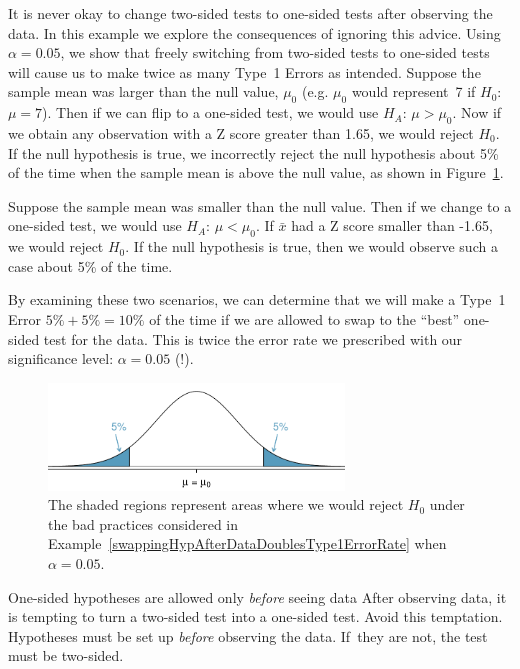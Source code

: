 \begin{example}{It is never okay to change two-sided tests to one-sided tests after observing the data. In this example we explore the consequences of ignoring this advice. Using $\alpha=0.05$, we show that freely switching from two-sided tests to one-sided tests will cause us to make twice as many Type~1 Errors as intended.} \label{swappingHypAfterDataDoublesType1ErrorRate}
Suppose the sample mean was larger than the null value, $\mu_0$ (e.g. $\mu_0$ would represent~7 if $H_0$:~$\mu = 7$). Then if we can flip to a one-sided test, we would use $H_A$: $\mu > \mu_0$. Now if we obtain any observation with a Z score greater than 1.65, we would reject $H_0$. If the null hypothesis is true, we incorrectly reject the null hypothesis about 5\% of the time when the sample mean is above the null value, as shown in Figure~\ref{type1ErrorDoublingExampleFigure}.

Suppose the sample mean was smaller than the null value. Then if we change to a one-sided test, we would use $H_A$: $\mu < \mu_0$. If $\bar{x}$ had a Z score smaller than -1.65, we would reject $H_0$. If the null hypothesis is true, then we would observe such a case about 5\% of the time.

By examining these two scenarios, we can determine that we will make a Type~1 Error $5\%+5\%=10\%$ of the time if we are allowed to swap to the ``best'' one-sided test for the data. This is twice the error rate we prescribed with our significance level: $\alpha=0.05$ (!).

\begin{figure}
   \centering
   \includegraphics[width=0.7\textwidth]{ch_inference_foundations/figures/type1ErrorDoublingExampleFigure/type1ErrorDoublingExampleFigure}
   \caption{The shaded regions represent areas where we would reject $H_0$ under the bad practices considered in Example~\ref{swappingHypAfterDataDoublesType1ErrorRate} when $\alpha = 0.05$.}
   \label{type1ErrorDoublingExampleFigure}
\end{figure}

\end{example}

\begin{caution}{One-sided hypotheses are allowed only \emph{before} seeing data}
{After observing data, it is tempting to turn a two-sided test into a one-sided test. Avoid this temptation. Hypotheses must be set up \emph{before} observing the data. If~they are not, the test must be two-sided.}
\end{caution}

